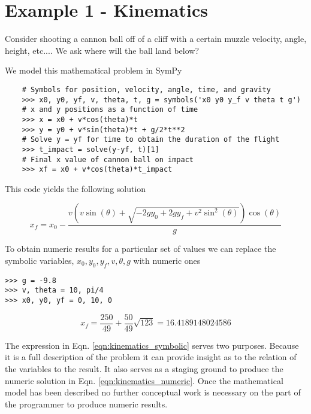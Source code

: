 \section{Example 1 - Kinematics}

Consider shooting a cannon ball off of a cliff with a certain muzzle velocity, angle, height, etc.... We ask where will the ball land below?

We model this mathematical problem in SymPy

\begin{lstlisting}
    # Symbols for position, velocity, angle, time, and gravity
    >>> x0, y0, yf, v, theta, t, g = symbols('x0 y0 y_f v theta t g') 
    # x and y positions as a function of time
    >>> x = x0 + v*cos(theta)*t
    >>> y = y0 + v*sin(theta)*t + g/2*t**2
    # Solve y = yf for time to obtain the duration of the flight
    >>> t_impact = solve(y-yf, t)[1]
    # Final x value of cannon ball on impact
    >>> xf = x0 + v*cos(theta)*t_impact
\end{lstlisting}
This code yields the following solution

\begin{equation}
\label{eqn:kinematics_symbolic}
x_f = x_{0} - \frac{v \left(v \sin{\left (\theta \right )} + \sqrt{- 2 g y_{0} + 2 g y_f + v^{2} \sin^{2}{\left (\theta \right )}}\right) \cos{\left (\theta \right )}}{g}
\end{equation}

To obtain numeric results for a particular set of values we can replace the symbolic variables, $x_0, y_0, y_f, v, \theta, g$ with numeric ones

\begin{lstlisting}
>>> g = -9.8
>>> v, theta = 10, pi/4
>>> x0, y0, yf = 0, 10, 0
\end{lstlisting}

\begin{equation}
\label{eqn:kinematics_numeric}
x_f = \frac{250}{49} + \frac{50}{49} \sqrt{123} = 16.4189148024586
\end{equation}

The expression in Eqn. \ref{eqn:kinematics_symbolic} serves two purposes. Because it is a full description of the problem it can provide insight as to the relation of the variables to the result. It also serves as a staging ground to produce the numeric solution in Eqn. \ref{eqn:kinematics_numeric}. Once the mathematical model has been described no further conceptual work is necessary on the part of the programmer to produce numeric results. 

